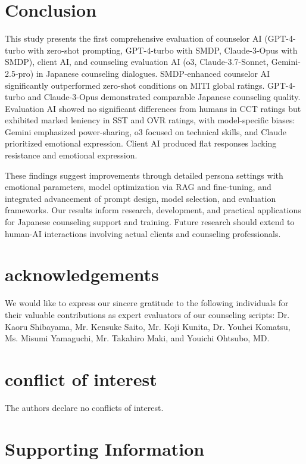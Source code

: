 \documentclass{wiley-article}
\begin{document}
\section*{Conclusion}

This study presents the first comprehensive evaluation of counselor AI (GPT-4-turbo with zero-shot prompting, GPT-4-turbo with SMDP, Claude-3-Opus with SMDP), client AI, and counseling evaluation AI (o3, Claude-3.7-Sonnet, Gemini-2.5-pro) in Japanese counseling dialogues. SMDP-enhanced counselor AI significantly outperformed zero-shot conditions on MITI global ratings. GPT-4-turbo and Claude-3-Opus demonstrated comparable Japanese counseling quality. Evaluation AI showed no significant differences from humans in CCT ratings but exhibited marked leniency in SST and OVR ratings, with model-specific biases: Gemini emphasized power-sharing, o3 focused on technical skills, and Claude prioritized emotional expression. Client AI produced flat responses lacking resistance and emotional expression.

These findings suggest improvements through detailed persona settings with emotional parameters, model optimization via RAG and fine-tuning, and integrated advancement of prompt design, model selection, and evaluation frameworks. Our results inform research, development, and practical applications for Japanese counseling support and training. Future research should extend to human-AI interactions involving actual clients and counseling professionals.



\section*{acknowledgements}
We would like to express our sincere gratitude to the following individuals for their valuable contributions as expert evaluators of our counseling scripts: Dr. Kaoru Shibayama, Mr. Kensuke Saito, Mr. Koji Kunita, Dr. Youhei Komatsu, Ms. Misumi Yamaguchi, Mr. Takahiro Maki, and Youichi Ohtsubo, MD.

\section*{conflict of interest}
The authors declare no conflicts of interest.

\section*{Supporting Information}
\end{document}

